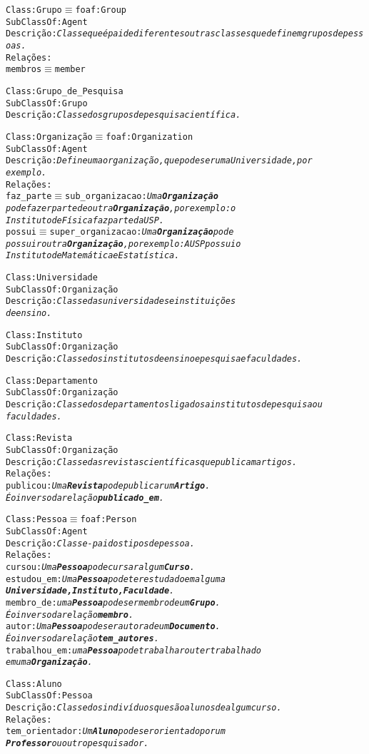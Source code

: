\begin{alltt}
Class: Grupo \( \equiv \) foaf:Group
SubClassOf: Agent
Descrição: \emph{Classe que é pai de diferentes outras classes que definem grupos de pessoas.}
Relações:
  membros \( \equiv \) member

Class: Grupo_de_Pesquisa
SubClassOf: Grupo
Descrição: \emph{Classe dos grupos de pesquisa científica.}

Class: Organização \( \equiv \) foaf:Organization
SubClassOf: Agent
Descrição: \emph{Define uma organização, que pode ser uma Universidade, por
exemplo.}
Relações:
  faz_parte \( \equiv \) sub_organizacao: \emph{Uma \textbf{Organização}
pode fazer parte de outra \textbf{Organização}, por exemplo: o
Instituto de Física faz parte da USP.}
  possui \( \equiv \) super_organizacao: \emph{Uma \textbf{Organização} pode
possuir outra \textbf{Organização}, por exemplo: A USP possui o
Instituto de Matemática e Estatística.}

Class: Universidade
SubClassOf: Organização
Descrição: \emph{Classe das universidades e instituições
de ensino.}

Class:Instituto
SubClassOf: Organização
Descrição: \emph{Classe dos institutos de ensino e pesquisa e faculdades.}

Class: Departamento
SubClassOf: Organização
Descrição: \emph{Classe dos departamentos ligados a institutos de pesquisa ou
faculdades.}

Class: Revista
SubClassOf: Organização
Descrição: \emph{Classe das revistas científicas que publicam artigos.}
Relações:
  publicou: \emph{Uma \textbf{Revista} pode publicar um \textbf{Artigo}.
É o inverso da relação \textbf{publicado_em}.}

Class: Pessoa \( \equiv \) foaf:Person
SubClassOf: Agent
Descrição: \emph{Classe-pai dos tipos de pessoa.}
Relações:
  cursou: \emph{Uma \textbf{Pessoa} pode cursar algum \textbf{Curso}.}
  estudou_em: \emph{Uma \textbf{Pessoa} pode ter estudado em alguma
\textbf{Universidade, Instituto, Faculdade}.}
  membro_de: \emph{uma \textbf{Pessoa} pode ser membro de um  \textbf{Grupo}.
É o inverso da relação \textbf{membro}.}
  autor: \emph{Uma \textbf{Pessoa} pode ser autora de um  \textbf{Documento}.
É o inverso da relação \textbf{tem_autores}.}
  trabalhou_em: \emph{uma \textbf{Pessoa} pode trabalhar ou ter trabalhado
em uma \textbf{Organização}.}

Class: Aluno
SubClassOf: Pessoa
Descrição: \emph{Classe dos indivíduos que são alunos de algum curso.}
Relações:
  tem_orientador: \emph{Um \textbf{Aluno} pode ser orientado por um
\textbf{Professor} ou outro pesquisador.}


\end{alltt}
